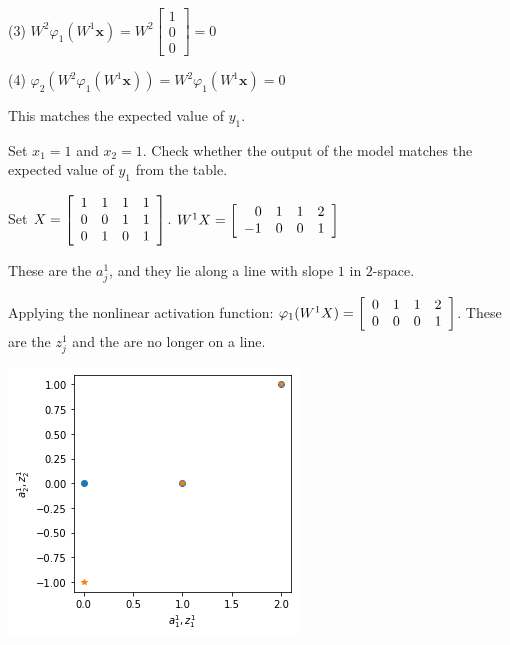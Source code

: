 \documentclass[12pt,letterpaper,noanswers]{exam}
\newcommand{\vc}[1]{\boldsymbol{#1}}
\begin{document}
\begin{enumerate}[resume=classQ]
\begin{parts}
    (3) $W^2\varphi_1(W^1\vc{x}) = W^2 \left[\begin{array}{r}1 \\0 \\ 0\end{array}\right] = 0$
    
    (4) $\varphi_2(W^2\varphi_1(W^1\vc{x})) = W^2\varphi_1(W^1\vc{x}) = 0$
    
    This matches the expected value of $y_1$.
    
    \item Set $x_1 = 1$ and $x_2 = 1$.  Check whether the output of the model matches the expected value of $y_1$ from the table.
    \vspace{1.5in}
    \end{parts}
\end{enumerate}

\noindent  Set $X = \left[\begin{array}{r r r r} 1 & 1 & 1 & 1 \\
0 & 0 & 1 & 1 \\
0 & 1 & 0 & 1\end{array}\right]$.  $W^1X = \left[\begin{array}{r r r r}
0 & 1 & 1 & 2 \\
-1 & 0 & 0 & 1\end{array}\right]$

\noindent  These are the $a_j^1$, and they lie along a line with slope $1$ in $2$-space.

\noindent  Applying the nonlinear activation function:
$\varphi_1(W^1X) = \left[\begin{array}{r r r r}
0 & 1 & 1 & 2 \\
0 & 0 & 0 & 1\end{array}\right]$.  These are the $z_j^1$ and the are no longer on a line.

\includegraphics[scale=0.5]{img/C22az.png}
\end{document}
